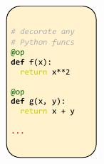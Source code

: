 \begin{figure}[h]
\centering
\begin{subfigure}{0.23\textwidth}
\centering
\includegraphics[width=\textwidth]{img/fig1.pdf}
\caption{}
\end{subfigure}
\begin{subfigure}{0.35\textwidth}
\centering

\end{subfigure}
\end{figure}
